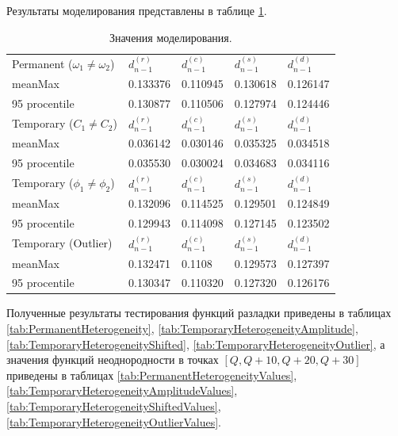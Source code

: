 \documentclass[specialist, substylefile = spbu.rtx,
			   subf, href, 12pt]{disser}
\begin{document}
Результаты моделирования представлены в таблице \ref{tab:ModellingResults}.
\begin{table}[!hhh]
	\center
	\caption{Значения моделирования.}
	\begin{tabular}{l|llll}
		Permanent ($\omega_1 \neq \omega_2$) & $ d_{n-1}^{(r)} $ & $ d_{n-1}^{(c)} $ & $ d_{n-1}^{(s)} $ & $ d_{n-1}^{(d)} $ \\
		meanMax & 0.133376 & 0.110945 & 0.130618 & 0.126147 \\
		95 procentile & 0.130877 & 0.110506 & 0.127974 & 0.124446 \\
		\hline
		Temporary ($C_1 \neq C_2$) & $ d_{n-1}^{(r)} $ & $ d_{n-1}^{(c)} $ & $ d_{n-1}^{(s)} $ & $ d_{n-1}^{(d)} $ \\
		meanMax & 0.036142 & 0.030146 & 0.035325 & 0.034518 \\
		95 procentile & 0.035530 & 0.030024 & 0.034683 & 0.034116 \\
		\hline
		Temporary ($\phi_1 \neq \phi_2$) & $ d_{n-1}^{(r)} $ & $ d_{n-1}^{(c)} $ & $ d_{n-1}^{(s)} $ & $ d_{n-1}^{(d)} $ \\
		meanMax & 0.132096 & 0.114525 & 0.129501 & 0.124849 \\
		95 procentile & 0.129943 & 0.114098 & 0.127145 & 0.123502 \\
		\hline
		Temporary (Outlier) & $ d_{n-1}^{(r)} $ & $ d_{n-1}^{(c)} $ & $ d_{n-1}^{(s)} $ & $ d_{n-1}^{(d)} $ \\
		meanMax & 0.132471 & 0.1108 & 0.129573 & 0.127397 \\
		95 procentile & 0.130347 & 0.110320 & 0.127320 & 0.126176
	\end{tabular}
	\label{tab:ModellingResults}
\end{table}


Полученные результаты тестирования функций разладки приведены в таблицах \ref{tab:PermanentHeterogeneity}, \ref{tab:TemporaryHeterogeneityAmplitude}, \ref{tab:TemporaryHeterogeneityShifted}, \ref{tab:TemporaryHeterogeneityOutlier}, а значения функций неоднородности в точках $[Q, Q+10, Q+20, Q+30] $ приведены в таблицах \ref{tab:PermanentHeterogeneityValues}, \ref{tab:TemporaryHeterogeneityAmplitudeValues}, \ref{tab:TemporaryHeterogeneityShiftedValues}, \ref{tab:TemporaryHeterogeneityOutlierValues}.
\end{document}

